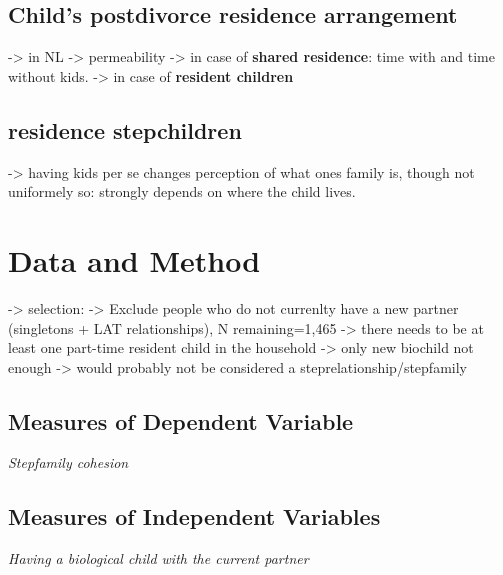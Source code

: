 \documentclass[\pandocDocMode,longtable,floatsintext]{apa6}
\begin{document}
\hypertarget{childs-postdivorce-residence-arrangement}{%
\subsection{Child's postdivorce residence
arrangement}\label{childs-postdivorce-residence-arrangement}}

-\textgreater{} in NL -\textgreater{} permeability -\textgreater{} in
case of \textbf{shared residence}: time with and time without kids.
-\textgreater{} in case of \textbf{resident children}

\hypertarget{residence-stepchildren}{%
\subsection{residence stepchildren}\label{residence-stepchildren}}

-\textgreater{} having kids per se changes perception of what ones
family is, though not uniformely so: strongly depends on where the child
lives.

\hypertarget{data-and-method}{%
\section{Data and Method}\label{data-and-method}}

-\textgreater{} selection: -\textgreater{} Exclude people who do not
currenlty have a new partner (singletons + LAT relationships), N
remaining=1,465 -\textgreater{} there needs to be at least one part-time
resident child in the household -\textgreater{} only new biochild not
enough -\textgreater{} would probably not be considered a
steprelationship/stepfamily

\hypertarget{measures-of-dependent-variable}{%
\subsection{Measures of Dependent
Variable}\label{measures-of-dependent-variable}}

\emph{Stepfamily cohesion}

\hypertarget{measures-of-independent-variables}{%
\subsection{Measures of Independent
Variables}\label{measures-of-independent-variables}}

\emph{Having a biological child with the current partner}
\end{document}

